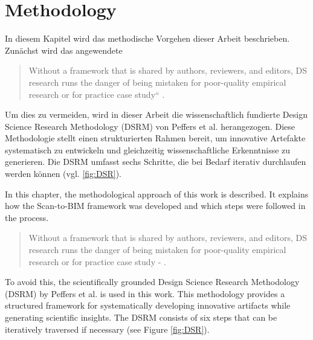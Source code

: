\chapter{Methodology}
\label{sec:methodology}

\begin{German}
    In diesem Kapitel wird das methodische Vorgehen dieser Arbeit beschrieben. Zunächst wird das angewendete 
    
    \begin{quote}
        Without a framework that is shared by authors, reviewers, and editors, DS research runs the danger of being mistaken for poor-quality empirical research or for practice case study“ \textcite{peffersPDFDesignScience2024}.\\
    \end{quote}
    
    Um dies zu vermeiden, wird in dieser Arbeit die wissenschaftlich fundierte Design Science Research Methodology (DSRM) von Peffers et al. \cite{peffersPDFDesignScience2024} herangezogen. Diese Methodologie stellt einen strukturierten Rahmen bereit, um innovative Artefakte systematisch zu entwickeln und gleichzeitig wissenschaftliche Erkenntnisse zu generieren. Die DSRM umfasst sechs Schritte, die bei Bedarf iterativ durchlaufen werden können (vgl. \ref{fig:DSR}).
\end{German}

\begin{English}
    In this chapter, the methodological approach of this work is described. It explains how the Scan-to-BIM framework was developed and which steps were followed in the process.

    \begin{quote}
        Without a framework that is shared by authors, reviewers, and editors, DS research runs the danger of being mistaken for poor-quality empirical research or for practice case study - \textcite{peffersPDFDesignScience2024}.\\
    \end{quote}
    
    To avoid this, the scientifically grounded Design Science Research Methodology (DSRM) by Peffers et al. \cite{peffersPDFDesignScience2024} is used in this work. This methodology provides a structured framework for systematically developing innovative artifacts while generating scientific insights. The DSRM consists of six steps that can be iteratively traversed if necessary (see Figure \ref{fig:DSR}).
\end{English}

